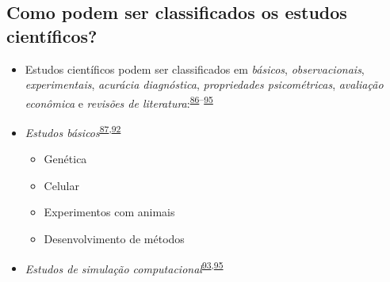 \documentclass[
]{book}
\providecommand{\tightlist}{%
  \setlength{\itemsep}{0pt}\setlength{\parskip}{0pt}}
\begin{document}
\hypertarget{como-podem-ser-classificados-os-estudos-cientuxedficos}{%
\subsection{Como podem ser classificados os estudos científicos?}\label{como-podem-ser-classificados-os-estudos-cientuxedficos}}

\begin{itemize}
\tightlist
\item
  Estudos científicos podem ser classificados em \emph{básicos}, \emph{observacionais}, \emph{experimentais}, \emph{acurácia diagnóstica}, \emph{propriedades psicométricas}, \emph{avaliação econômica} e \emph{revisões de literatura}:\textsuperscript{\protect\hyperlink{ref-Grant2009}{86}--\protect\hyperlink{ref-chipman2022}{95}}
\end{itemize}

\begin{itemize}
\tightlist
\item
  \emph{Estudos básicos}\textsuperscript{\protect\hyperlink{ref-Suxfct2014}{87},\protect\hyperlink{ref-Chidambaram2019}{92}}

  \begin{itemize}
  \tightlist
  \item
    Genética
  \item
    Celular
  \item
    Experimentos com animais
  \item
    Desenvolvimento de métodos
  \end{itemize}
\end{itemize}

\begin{itemize}
\tightlist
\item
  \emph{Estudos de simulação computacional}\textsuperscript{\protect\hyperlink{ref-Erdemir2020}{93},\protect\hyperlink{ref-chipman2022}{95}}
\end{itemize}
\end{document}
